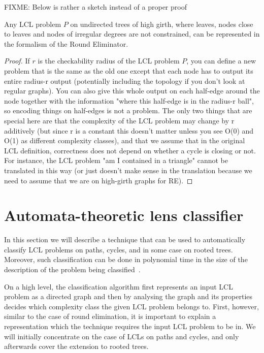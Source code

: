 FIXME: Below is rather a sketch instead of a proper proof
\begin{theorem}\label{theorem:re_formalism_is_general}
Any LCL problem $P$ on undirected trees of high girth, where
leaves, nodes close to leaves and nodes of irregular degrees are
not constrained, can be represented in the formalism of the
Round Eliminator.
\end{theorem}
\begin{proof}
  If $r$ is the checkability radius of the LCL problem $P$, you can define a new problem that is the same as the old one except that each node has to output its entire radius-r output (potentially including the topology if you don't look at regular graphs). You can also give this whole output on each half-edge around the node together with the information "where this half-edge is in the radius-r ball", so encoding things on half-edges is not a problem.
  The only two things that are special here are that the complexity of the LCL problem may change by r additively (but since r is a constant this doesn't matter unless you see O(0) and O(1) as different complexity classes), and that we assume that in the original LCL definition, correctness does not depend on whether a cycle is closing or not. For instance, the LCL problem "am I contained in a triangle" cannot be translated in this way (or just doesn't make sense in the translation because we need to assume that we are on high-girth graphs for RE).
\end{proof}

\section{Automata-theoretic lens classifier}

In this section we will describe a technique that can be used to automatically
classify LCL problems on paths, cycles, and in some case on rooted trees.
Moreover, such classification can be done in polynomial time in the size
of the description of the problem being classified~\cite{Chang2020}.

On a high level, the classification algorithm first represents an input LCL problem as
a directed graph and then by analysing the graph and its properties decides
which complexity class the given LCL problem belongs to. First, however, similar to
the case of round elimination, it is important to explain a representation which
the technique requires the input LCL problem to be in. We will initially concentrate on the case
of LCLs on paths and cycles, and only afterwards cover the extension to rooted trees.

